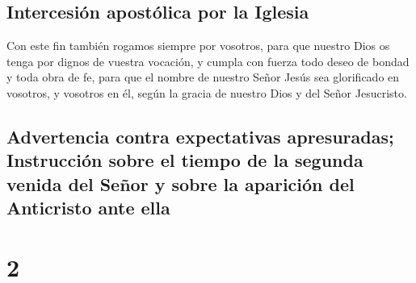 \hypertarget{intercesiuxf3n-apostuxf3lica-por-la-iglesia}{%
\subsection{Intercesión apostólica por la
Iglesia}\label{intercesiuxf3n-apostuxf3lica-por-la-iglesia}}

 Con este fin también rogamos siempre por vosotros, para
que nuestro Dios os tenga por dignos de vuestra vocación, y cumpla con
fuerza todo deseo de bondad y toda obra de fe,  para que
el nombre de nuestro Señor Jesús sea glorificado en vosotros, y vosotros
en él, según la gracia de nuestro Dios y del Señor Jesucristo.

\hypertarget{advertencia-contra-expectativas-apresuradas-instrucciuxf3n-sobre-el-tiempo-de-la-segunda-venida-del-seuxf1or-y-sobre-la-apariciuxf3n-del-anticristo-ante-ella}{%
\subsection{Advertencia contra expectativas apresuradas; Instrucción
sobre el tiempo de la segunda venida del Señor y sobre la aparición del
Anticristo ante
ella}\label{advertencia-contra-expectativas-apresuradas-instrucciuxf3n-sobre-el-tiempo-de-la-segunda-venida-del-seuxf1or-y-sobre-la-apariciuxf3n-del-anticristo-ante-ella}}

\hypertarget{section-1}{%
\section{2}\label{section-1}}

